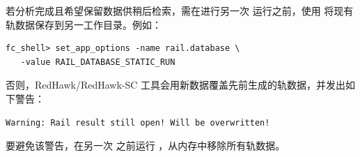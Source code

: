 若分析完成且希望保留数据供稍后检索，需在进行另一次  运行之前，使用  将现有轨数据保存到另一工作目录。例如：
\begin{lstlisting}
fc_shell> set_app_options -name rail.database \
   -value RAIL_DATABASE_STATIC_RUN
\end{lstlisting}

否则，RedHawk/RedHawk-SC 工具会用新数据覆盖先前生成的轨数据，并发出如下警告：
\begin{lstlisting}
Warning: Rail result still open! Will be overwritten!
\end{lstlisting}

要避免该警告，在另一次  之前运行 ，从内存中移除所有轨数据。
